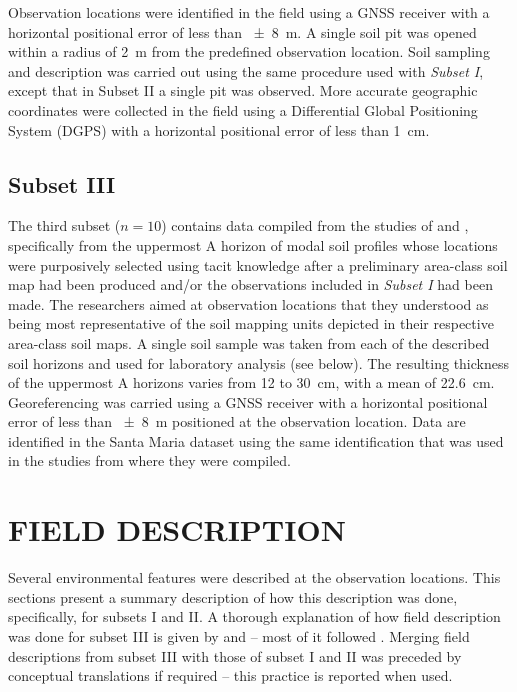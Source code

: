 Observation locations were identified in the field using a GNSS receiver with a horizontal positional error
of less than \SI{\pm8}{\metre}. A single soil pit was opened within a radius of \SI{2}{\metre} from the 
predefined observation location. Soil sampling and description was carried out using the same procedure used 
with \emph{Subset I}, except that in Subset II a single pit was observed. More accurate geographic coordinates 
were collected in the field using a Differential Global Positioning System (DGPS) with a horizontal positional 
error of less than \SI{1}{\centi\metre}.

\subsection{Subset III}

The third subset ($n = 10$) contains data compiled from the studies of  and
, specifically from the uppermost A horizon of modal soil profiles whose locations 
were purposively selected using tacit knowledge after a preliminary area-class soil map had been produced 
and/or the observations included in \emph{Subset I} had been made. The researchers aimed at observation 
locations that they understood as being most representative of the soil mapping units depicted in their 
respective area-class soil maps. A single soil sample was taken from each of the described soil horizons and 
used for laboratory analysis (see below). The resulting thickness of the uppermost A horizons varies from 
\num{12} to \SI{30}{\centi\metre}, with a mean of \SI{22.6}{\centi\metre}. Georeferencing was carried using a 
GNSS receiver with a horizontal positional error of less than \SI{\pm8}{\metre} positioned at the observation 
location. Data are identified in the Santa Maria dataset using the same identification that was used in the 
studies from where they were compiled.

\section{FIELD DESCRIPTION}

Several environmental features were described at the observation locations. This sections present a summary
description of how this description was done, specifically, for subsets I and II. A thorough explanation of 
how field description was done for subset III is given by \citet{Pedron2005} and \citet{Miguel2010} -- most of 
it followed \citet{SantosEtAl2013}. Merging field descriptions from subset III with those of subset I and II 
was preceded by conceptual translations if required -- this practice is reported when used.

